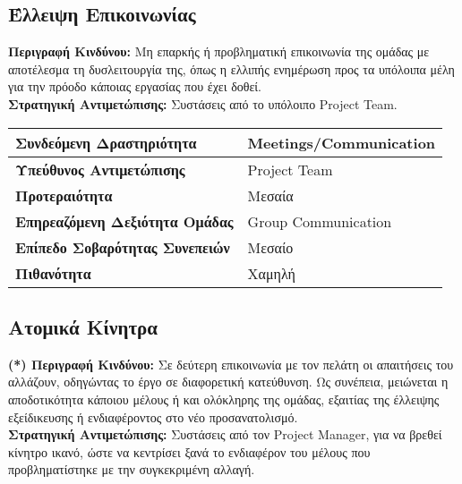 \documentclass{article}
\newcommand\T{\rule{0pt}{2.6ex}}       %
\newcommand\B{\rule[-1.2ex]{0pt}{0pt}}
\begin{document}
 
 \subsection{Έλλειψη Επικοινωνίας}
 
\textbf{Περιγραφή Κινδύνου:} Μη επαρκής ή προβληματική επικοινωνία της ομάδας με αποτέλεσμα τη δυσλειτουργία της, όπως η ελλιπής ενημέρωση προς τα υπόλοιπα μέλη για την πρόοδο κάποιας εργασίας που έχει δοθεί.\\
 
\textbf{Στρατηγική Αντιμετώπισης:} Συστάσεις από το υπόλοιπο Project Team.

\vspace{0.2cm}
 
  \begin{center}
     \begin{tabular}{|l|l|}
     \hline
      \textbf{Συνδεόμενη Δραστηριότητα} & Meetings/Communication \T\B \\ 
      \hline
      \textbf{Υπεύθυνος Αντιμετώπισης} & Project Team \T\B \\
      \hline
      \textbf{Προτεραιότητα} & Μεσαία \T\B \\
      \hline
      \textbf{Επηρεαζόμενη Δεξιότητα Ομάδας} & Group Communication \T\B \\
      \hline
      \textbf{Επίπεδο Σοβαρότητας Συνεπειών} & Μεσαίο \T\B \\
      \hline
      \textbf{Πιθανότητα} & Χαμηλή \T\B \\
      \hline
     \end{tabular}
 \end{center}
 
  
\subsection{Ατομικά Κίνητρα}
 
\textbf{(*) Περιγραφή Κινδύνου:} Σε δεύτερη επικοινωνία με τον πελάτη οι απαιτήσεις του αλλάζουν, οδηγώντας το έργο σε διαφορετική κατεύθυνση. Ως συνέπεια, μειώνεται η αποδοτικότητα κάποιου μέλους ή και ολόκληρης της ομάδας, εξαιτίας της έλλειψης εξείδικευσης ή ενδιαφέροντος στο νέο προσανατολισμό. \\

\textbf{Στρατηγική Αντιμετώπισης:} Συστάσεις από τον Project Manager, για να βρεθεί κίνητρο ικανό, ώστε να κεντρίσει ξανά το ενδιαφέρον του μέλους που προβληματίστηκε με την συγκεκριμένη αλλαγή.

\vspace{0.2cm}
 
\end{document}
